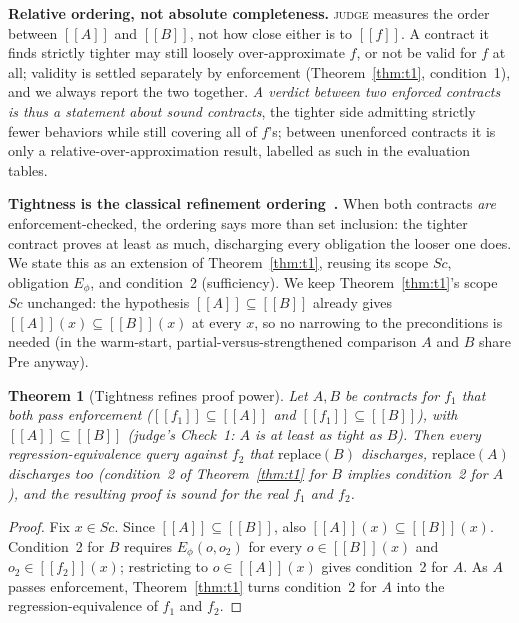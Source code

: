 \documentclass[conference]{IEEEtran}
\newtheorem{theorem}{Theorem}
\theoremstyle{definition}
\theoremstyle{remark}
\newcommand{\sem}[1]{[\![#1]\!]}
\begin{document}
\textbf{Relative ordering, not absolute completeness.} \textsc{judge}
measures the order between $\sem{A}$ and $\sem{B}$, not how close either
is to $\sem{f}$. A contract it
finds strictly tighter may still loosely over-approximate $f$, or not be
valid for $f$ at all; validity is settled separately by enforcement
(Theorem~\ref{thm:t1}, condition~1), and we always report the two
together. \textit{A verdict between two enforced contracts is thus a statement
about sound contracts}, the tighter side admitting strictly fewer
behaviors while still covering all of $f$'s; between unenforced
contracts it is only a relative-over-approximation result, labelled as
such in the evaluation tables.

\textbf{Tightness is the classical refinement
ordering~\cite{liskov1994subtyping,back1998refinement}.} When both
contracts \emph{are} enforcement-checked, the ordering says more than
set inclusion: the tighter contract proves at least as much,
discharging every obligation the looser one does. We state this as an
extension of Theorem~\ref{thm:t1}, reusing its scope $\mathit{Sc}$,
obligation $E_\phi$, and condition~2 (sufficiency). We keep
Theorem~\ref{thm:t1}'s scope $\mathit{Sc}$ unchanged: the hypothesis
$\sem{A}\subseteq\sem{B}$ already gives $\sem{A}(x)\subseteq\sem{B}(x)$
at every $x$, so no narrowing to the preconditions is needed (in the
  warm-start, partial-versus-strengthened comparison $A$ and $B$ share
$\text{Pre}$ anyway).

\begin{theorem}[Tightness refines proof power]\label{thm:t2}
  Let $A, B$ be contracts for $f_1$ that both pass enforcement
  ($\sem{f_1}\subseteq\sem{A}$ and $\sem{f_1}\subseteq\sem{B}$), with
  $\sem{A}\subseteq\sem{B}$ (judge's Check~1: $A$ is at least as tight as
  $B$). Then every regression-equivalence query against $f_2$ that
  $\text{replace}(B)$ discharges, $\text{replace}(A)$ discharges
  too (condition~2 of Theorem~\ref{thm:t1} for $B$ implies condition~2
  for $A$), and the resulting proof is sound for the real $f_1$ and
  $f_2$.
\end{theorem}
\begin{proof}
  Fix $x\in\mathit{Sc}$. Since $\sem{A}\subseteq\sem{B}$, also
  $\sem{A}(x)\subseteq\sem{B}(x)$. Condition~2 for $B$ requires
  $E_\phi(o,o_2)$ for every $o\in\sem{B}(x)$ and $o_2\in\sem{f_2}(x)$;
  restricting to $o\in\sem{A}(x)$ gives condition~2 for $A$. As $A$
  passes enforcement, Theorem~\ref{thm:t1} turns condition~2 for $A$
  into the regression-equivalence of $f_1$ and $f_2$.
\end{proof}
\end{document}
